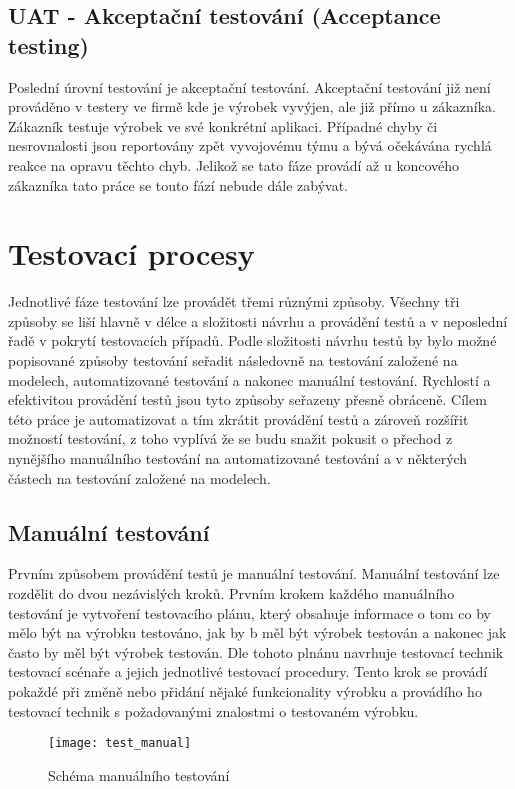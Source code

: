 \subsection{UAT - Akceptační testování (Acceptance testing)}
Poslední úrovní testování je akceptační testování. Akceptační testování již není prováděno v testery ve firmě kde je výrobek vyvýjen, ale již přímo u zákazníka. Zákazník testuje výrobek ve své konkrétní aplikaci. Případné chyby či nesrovnalosti jsou reportovány zpět vyvojovému týmu a bývá očekávána rychlá reakce na opravu těchto chyb. Jelikož se tato fáze provádí až u koncového zákazníka tato práce se touto fází nebude dále zabývat.


\section{Testovací procesy}
Jednotlivé fáze testování lze provádět třemi různými způsoby. Všechny tři způsoby se liší hlavně v délce a složitosti návrhu a provádění testů a v neposlední řadě v pokrytí testovacích případů. Podle složitosti návrhu testů by bylo možné popisované způsoby testování seřadit následovně na testování založené na modelech, automatizované testování a nakonec manuální testování. Rychlostí a efektivitou provádění testů jsou tyto způsoby seřazeny přesně obráceně. Cílem této práce je automatizovat a tím zkrátit provádění testů a zároveň rozšířit možností testování, z toho vyplívá že se budu snažit pokusit o přechod z nynějšího manuálního testování na automatizované testování a v některých částech na testování založené na modelech.

\subsection{Manuální testování}
Prvním způsobem provádění testů je manuální testování. Manuální testování lze rozdělit do dvou nezávislých kroků. Prvním krokem každého manuálního testování je vytvoření testovacího plánu, který obsahuje informace o tom co by mělo být na výrobku testováno, jak by b měl být výrobek testován a nakonec jak často by měl být výrobek testován. Dle tohoto plnánu navrhuje testovací technik testovací scénaře a jejich jednotlivé testovací procedury. Tento krok se provádí pokaždé při změně nebo přidání nějaké funkcionality výrobku a provádího ho testovací technik s požadovanými znalostmi o testovaném výrobku.

\begin{figure}[h]
  \centering
  \texttt{[image: test\_manual]}
  \caption{Schéma manuálního testování}
  \label{fig:test_manual}
\end{figure}

